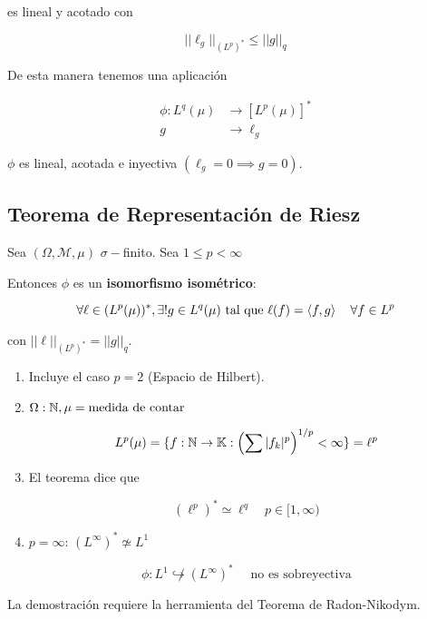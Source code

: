 es lineal y acotado con 

\[||\ell_g||_{(L^p)^*}\leq ||g||_q\]

De esta manera tenemos una aplicación

\begin{align*}
    \phi:L^q(\mu)&\to [L^p(\mu)]^*\\
    g&\to\ell_g
\end{align*}

$\phi$ es lineal, acotada e inyectiva $(\ell_g=0\implies g=0)$.

\subsection{Teorema de Representación de Riesz}

\begin{ftheorem}
    Sea $(\Omega,\mathcal{M},\mu)$ $\sigma-$finito. Sea $1\leq p<\infty$

Entonces $\phi$ es un \textbf{isomorfismo isométrico}:

\[\forall \ell\in (L^p(\mu))^*,\exists !g\in L^q(\mu)\text{ tal que } \ell(f)=\left\langle f,g\right\rangle\quad\forall f\in L^p\]

con $||\ell||_{(L^p)^*}=||g||_q$.

\end{ftheorem}

\begin{fnote}
    \begin{enumerate}
        \item Incluye el caso $p=2$ (Espacio de Hilbert).
        \item $\Omega:\mathbb{N},\mu=\text{medida de contar}$
        
        \[L^p(\mu)=\{f:\mathbb{N}\to\mathbb{K}:\left(\sum |f_k|^p\right)^{1/p}<\infty\}=\ell^p\]

        \item El teorema dice que
        
        \[(\ell^p)^*\simeq \ell^q\quad p\in [1,\infty)\]

        \item $p=\infty$: $(L^\infty)^*\not\simeq L^1$
        
        \[\phi:L^1 \not \hookrightarrow (L^\infty)^*\quad\text{ no es sobreyectiva}\]
    \end{enumerate}
\end{fnote}

La demostración requiere la herramienta del Teorema de Radon-Nikodym.

